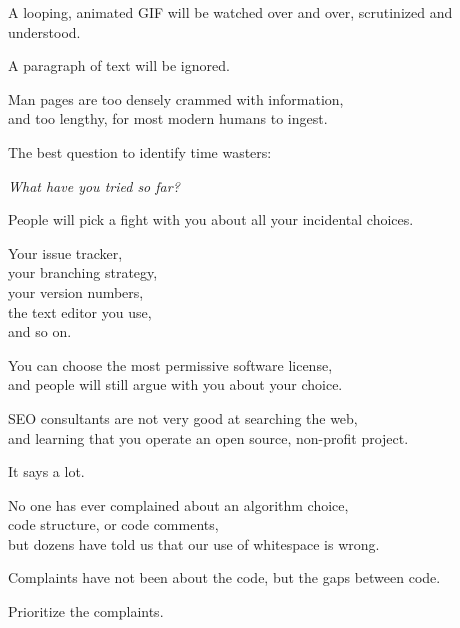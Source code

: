 \documentclass[t,handout,aspectratio=169]{beamer}
\begin{document}
\begin{frame}[fragile]%
    \vfill
    A looping, animated GIF will be watched over and over, scrutinized and understood. \pause

    A paragraph of text will be ignored.
\end{frame}

\begin{frame}[fragile]%
    \vfill
    Man pages are too densely crammed with information, \\
    and too lengthy, for most modern humans to ingest.
\end{frame}

\begin{frame}[fragile]%
    \vfill
    The best question to identify time wasters: \pause

    \textit{What have you tried so far?}
\end{frame}

\begin{frame}[fragile]%
    \vfill
    People will pick a fight with you about all your incidental choices. \pause

    Your issue tracker, \\
    your branching strategy, \\
    your version numbers, \\
    the text editor you use, \\
    and so on.
\end{frame}

\begin{frame}[fragile]%
    \vfill
    You can choose the most permissive software license, \\
    and people will still argue with you about your choice.
\end{frame}

\begin{frame}[fragile]%
    \vfill
    SEO consultants are not very good at searching the web, \pause \\
    and learning that you operate an open source, non-profit project. \pause

    It says a lot.
\end{frame}

\begin{frame}[fragile]%
    \vfill
    No one has ever complained about an algorithm choice, \\
    code structure, or code comments, \pause \\
    but dozens have told us that our use of whitespace is wrong. \pause

    Complaints have not been about the code, but the gaps between code. \pause

    Prioritize the complaints.
\end{frame}
\end{document}
